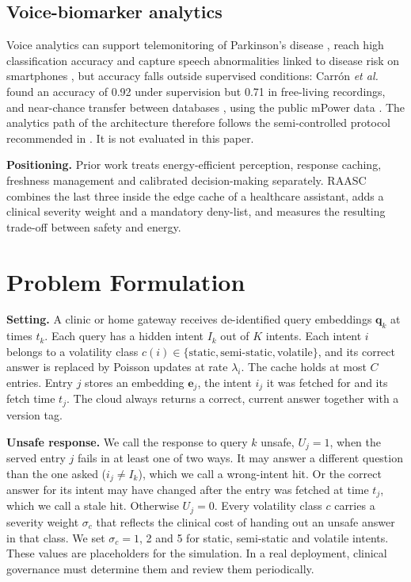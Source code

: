 \documentclass[journal]{IEEEtran}
\begin{document}
\subsection{Voice-biomarker analytics}
Voice analytics can support telemonitoring of Parkinson's disease \cite{little2009}, reach high classification accuracy \cite{tsanas2012} and capture speech abnormalities linked to disease risk on smartphones \cite{rusz2018}, but accuracy falls outside supervised conditions: Carr\'on \emph{et al.} found an accuracy of 0.92 under supervision but 0.71 in free-living recordings, and near-chance transfer between databases \cite{carron2021}, using the public mPower data \cite{bot2016}. The analytics path of the architecture therefore follows the semi-controlled protocol recommended in \cite{carron2021}. It is not evaluated in this paper.

\textbf{Positioning.} Prior work treats energy-efficient perception, response caching, freshness management and calibrated decision-making separately. RAASC combines the last three inside the edge cache of a healthcare assistant, adds a clinical severity weight and a mandatory deny-list, and measures the resulting trade-off between safety and energy.

\section{Problem Formulation}\label{sec:problem}
\textbf{Setting.} A clinic or home gateway receives de-identified query embeddings $\mathbf{q}_k$ at times $t_k$. Each query has a hidden intent $I_k$ out of $K$ intents. Each intent $i$ belongs to a volatility class $c(i)\in\{\text{static},\text{semi-static},\text{volatile}\}$, and its correct answer is replaced by Poisson updates at rate $\lambda_i$. The cache holds at most $C$ entries. Entry $j$ stores an embedding $\mathbf{e}_j$, the intent $i_j$ it was fetched for and its fetch time $t_j$. The cloud always returns a correct, current answer together with a version tag.

\textbf{Unsafe response.} We call the response to query $k$ unsafe, $U_j=1$, when the served entry $j$ fails in at least one of two ways. It may answer a different question than the one asked ($i_j\neq I_k$), which we call a wrong-intent hit. Or the correct answer for its intent may have changed after the entry was fetched at time $t_j$, which we call a stale hit. Otherwise $U_j=0$. Every volatility class $c$ carries a severity weight $\sigma_c$ that reflects the clinical cost of handing out an unsafe answer in that class. We set $\sigma_c=1$, 2 and 5 for static, semi-static and volatile intents. These values are placeholders for the simulation. In a real deployment, clinical governance must determine them and review them periodically.
\end{document}
